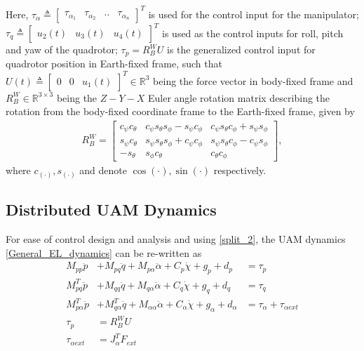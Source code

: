 \documentclass[letterpaper, 10 pt, conference]{ieeeconf}  %
\begin{document}
Here,    $\tau_{\alpha} \triangleq
	\begin{bmatrix}
	\tau_{\alpha_1} & \tau_{\alpha_2}  & .. & \tau_{\alpha_n}
	\end{bmatrix}^T$ is used for the control input for the manipulator; $\tau_q  \triangleq 
	\begin{bmatrix}
	u_2(t) & u_3(t) & u_4(t)
	\end{bmatrix}^T$ is used as the control inputs for roll, pitch and yaw of the quadrotor; ${\tau_{p}} = {R^W_B U}$ is the generalized control input for quadrotor position in Earth-fixed frame, such that ${U}(t)\triangleq
	\begin{bmatrix}
	0 & 0 & u_1(t)
	\end{bmatrix}^T\in \mathbb{R}^3$ being the force vector in body-fixed frame and ${R_B^W} \in\mathbb{R}^{3\times3}$ being the $Z-Y-X$ Euler angle rotation matrix describing the rotation from the body-fixed coordinate frame to the Earth-fixed frame, given by
	\begin{align}
	{R_B^W} =
	\begin{bmatrix}
	c_{\psi}c_{\theta} & c_{\psi}s_{\theta}s_{\phi} - s_{\psi}c_{\phi} & c_{\psi}s_{\theta}c_{\phi} + s_{\psi}s_{\phi} \\
	s_{\psi}c_{\theta} & s_{\psi}s_{\theta}s_{\phi} + c_{\psi}c_{\phi} & s_{\psi}s_{\theta}c_{\phi} - c_{\psi}s_{\phi} \\
	-s_{\theta} & s_{\phi}c_{\theta} & c_{\theta}c_{\phi}
	\end{bmatrix}, \label{rot_matrix}
	\end{align}
	where $c_{(\cdot)} , s_{(\cdot)}$ and denote $\cos{(\cdot)} , \sin{(\cdot)}$ respectively.

 \subsection{Distributed UAM Dynamics}

For ease of control design and analysis and using \eqref{split_2}, the UAM dynamics \eqref{General_EL_dynamics} can be re-written as
\begin{subequations} \label{dynamics}
	\begin{align}
	M_{pp}\ddot{p} &+ M_{pq}\ddot{q} + M_{p\alpha}\ddot{\alpha} + C_{p}\dot{\chi} + g_{p} + d_{p} &= \tau_{p} \label{pos}\\
	M_{pq}^T\ddot{p} &+ M_{qq}\ddot{q} + M_{q\alpha}\ddot{\alpha} + C_{q}\dot{\chi} + g_{q} + d_{q} &= \tau_{q} \label{att} \\
	M_{p\alpha}^T\ddot{p} &+ M_{q\alpha}^T\ddot{q} + M_{\alpha\alpha}\ddot{\alpha} + C_{\alpha} \dot{\chi} + g_{\alpha} + d_{\alpha} &= \tau_{\alpha} + \tau_{\alpha ext} \label{man}\\
	\tau_{p} &= R^W_B U \label{conv}\\
	\tau_{\alpha ext} &= J_{\alpha}^T F_{ext}
	\end{align}
\end{subequations}
\end{document}
